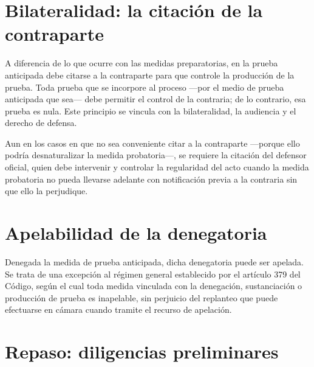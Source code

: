 \documentclass[12pt,oneside]{book}
\begin{document}

\section{Bilateralidad: la citación de la contraparte}

\begin{important}
A diferencia de lo que ocurre con las medidas preparatorias, en la prueba anticipada debe citarse a la contraparte para que controle la producción de la prueba. Toda prueba que se incorpore al proceso —por el medio de prueba anticipada que sea— debe permitir el control de la contraria; de lo contrario, esa prueba es nula. Este principio se vincula con la bilateralidad, la audiencia y el derecho de defensa.
\end{important}

Aun en los casos en que no sea conveniente citar a la contraparte —porque ello podría desnaturalizar la medida probatoria—, se requiere la citación del defensor oficial, quien debe intervenir y controlar la regularidad del acto cuando la medida probatoria no pueda llevarse adelante con notificación previa a la contraria sin que ello la perjudique.

\section{Apelabilidad de la denegatoria}

Denegada la medida de prueba anticipada, dicha denegatoria puede ser apelada. Se trata de una excepción al régimen general establecido por el artículo 379 del Código, según el cual toda medida vinculada con la denegación, sustanciación o producción de prueba es inapelable, sin perjuicio del replanteo que puede efectuarse en cámara cuando tramite el recurso de apelación.

\section*{Repaso: diligencias preliminares}
\end{document}
